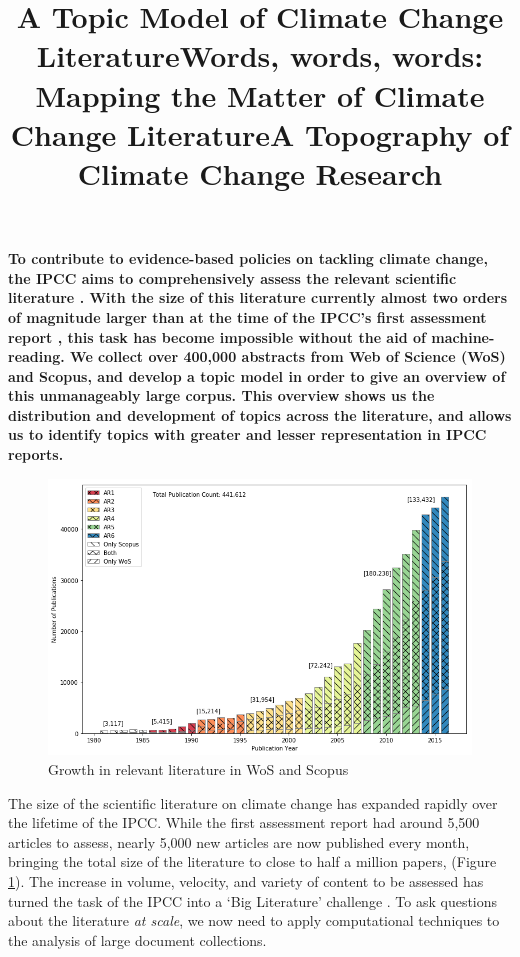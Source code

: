 \documentclass{article}
\title{A Topic Model of Climate Change Literature}
\title{Words, words, words: Mapping the Matter of Climate Change Literature}
\title{A Topography of Climate Change Research}
\begin{document}
\maketitle

\linenumbers

\textbf{
To contribute to evidence-based policies on tackling climate change, the IPCC aims to comprehensively assess the relevant scientific literature \citep{IPCC2013}. With the size of this literature currently almost two orders of magnitude larger than at the time of the IPCC's first assessment report \citep{Houghton1990ClimateAssessment}, this task has become impossible without the aid of machine-reading. We collect over 400,000 abstracts from Web of Science (WoS) and Scopus, and develop a topic model in order to give an overview of this unmanageably large corpus. This overview shows us the distribution and development of topics across the literature, and allows us to identify topics with greater and lesser representation in IPCC reports. %
}

\begin{figure}
\begin{center}
	\includegraphics[width=0.8\linewidth]{plots/wos_scopus_docs_time}
    \caption{Growth in relevant literature in WoS and Scopus}
    \label{growth}
    \end{center}
\end{figure}

The size of the scientific literature on climate change has expanded rapidly over the lifetime of the IPCC. While the first assessment report had around 5,500 articles to assess, nearly 5,000 new articles are now published every month, bringing the total size of the literature to close to half a million papers, (Figure \ref{growth}).  The increase in volume, velocity, and variety of content to be assessed has turned the task of the IPCC into a `Big Literature' challenge \citep{Minx2017BigChange}. To ask questions about the literature \textit{at scale}, we now need to apply computational techniques to the analysis of large document collections.
\end{document}
